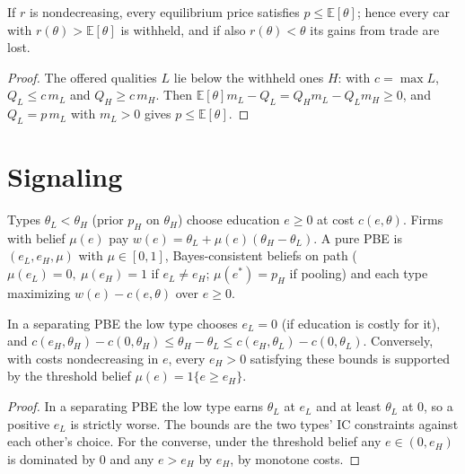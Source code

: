 \begin{theorem}
\label{thm:lemons-gains}
\leanok
{}
If $r$ is nondecreasing, every equilibrium price satisfies $p\le\mathbb{E}[\theta]$; hence every car with
$r(\theta)>\mathbb{E}[\theta]$ is withheld, and if also $r(\theta)<\theta$ its gains from trade are lost.
\end{theorem}
\begin{proof}
\leanok
The offered qualities $L$ lie below the withheld ones $H$: with $c=\max L$, $Q_L\le c\,m_L$ and $Q_H\ge c\,m_H$.
Then $\mathbb{E}[\theta]m_L-Q_L=Q_H m_L-Q_L m_H\ge0$, and $Q_L=p\,m_L$ with $m_L>0$ gives $p\le\mathbb{E}[\theta]$.
\end{proof}

\section{Signaling}
\label{sec:spence}

\begin{definition}
\label{def:spence}
\leanok
Types $\theta_L < \theta_H$ (prior $p_H$ on $\theta_H$) choose education $e \ge 0$ at cost $c(e,\theta)$.
Firms with belief $\mu(e)$ pay $w(e) = \theta_L + \mu(e)(\theta_H - \theta_L)$. A pure PBE is $(e_L, e_H, \mu)$
with $\mu \in [0,1]$, Bayes-consistent beliefs on path ($\mu(e_L)=0,\ \mu(e_H)=1$ if $e_L\ne e_H$;
$\mu(e^*) = p_H$ if pooling) and each type maximizing $w(e) - c(e,\theta)$ over $e \ge 0$.
\end{definition}

\begin{theorem}
\label{thm:spence-sep}
\leanok
{}
In a separating PBE the low type chooses $e_L = 0$ (if education is costly for it), and
$c(e_H,\theta_H) - c(0,\theta_H) \le \theta_H - \theta_L \le c(e_H,\theta_L) - c(0,\theta_L)$. Conversely, with costs
nondecreasing in $e$, every $e_H > 0$ satisfying these bounds is supported by the threshold belief
$\mu(e) = 1\{e \ge e_H\}$.
\end{theorem}
\begin{proof}
\leanok
In a separating PBE the low type earns $\theta_L$ at $e_L$ and at least $\theta_L$ at $0$, so a positive $e_L$ is strictly
worse. The bounds are the two types' IC constraints against each other's choice. For the converse, under
the threshold belief any $e \in (0,e_H)$ is dominated by $0$ and any $e > e_H$ by $e_H$, by monotone costs.
\end{proof}

